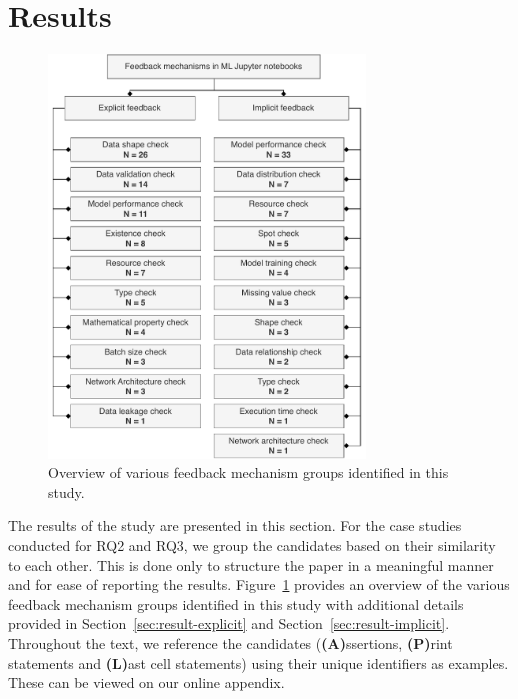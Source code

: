 \section{Results}


\begin{figure}
  \centering
  \includegraphics[width=0.75\textwidth]{taxonomy.pdf}
  \caption{Overview of various feedback mechanism groups identified in this study.}
  \label{fig:taxonomy}
\end{figure}


The results of the study are presented in this section. For the case studies conducted for RQ2 and RQ3, we group the candidates based on their similarity to each other. This is done only to structure the paper in a meaningful manner and for ease of reporting the results. Figure~\ref{fig:taxonomy} provides an overview of the various feedback mechanism groups identified in this study with additional details provided in Section~\ref{sec:result-explicit} and Section~\ref{sec:result-implicit}. Throughout the text, we reference the candidates (\textbf{(A)}ssertions, \textbf{(P)}rint statements and \textbf{(L)}ast cell statements) using their unique identifiers as examples. These can be viewed on our online appendix.

